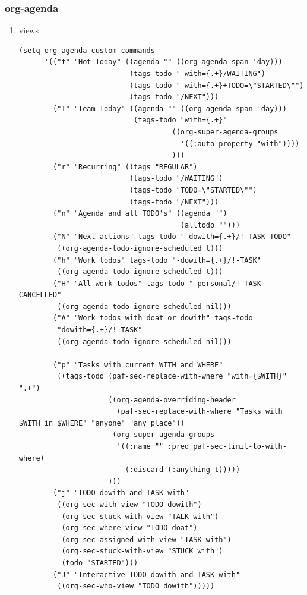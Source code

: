 \documentclass[11pt]{article}
\begin{document}
\subsubsection{org-agenda}
\label{sec:orge0fe785}
\begin{enumerate}
\item views
\label{sec:org885ad2a}
\begin{verbatim}
(setq org-agenda-custom-commands
      '(("t" "Hot Today" ((agenda "" ((org-agenda-span 'day)))
                          (tags-todo "-with={.+}/WAITING")
                          (tags-todo "-with={.+}+TODO=\"STARTED\"")
                          (tags-todo "/NEXT")))
        ("T" "Team Today" ((agenda "" ((org-agenda-span 'day)))
                           (tags-todo "with={.+}"
                                    ((org-super-agenda-groups
                                      '((:auto-property "with"))))
                                    )))
        ("r" "Recurring" ((tags "REGULAR")
                          (tags-todo "/WAITING")
                          (tags-todo "TODO=\"STARTED\"")
                          (tags-todo "/NEXT")))
        ("n" "Agenda and all TODO's" ((agenda "")
                                      (alltodo "")))
        ("N" "Next actions" tags-todo "-dowith={.+}/!-TASK-TODO"
         ((org-agenda-todo-ignore-scheduled t)))
        ("h" "Work todos" tags-todo "-dowith={.+}/!-TASK"
         ((org-agenda-todo-ignore-scheduled t)))
        ("H" "All work todos" tags-todo "-personal/!-TASK-CANCELLED"
         ((org-agenda-todo-ignore-scheduled nil)))
        ("A" "Work todos with doat or dowith" tags-todo
         "dowith={.+}/!-TASK"
         ((org-agenda-todo-ignore-scheduled nil)))

        ("p" "Tasks with current WITH and WHERE"
         ((tags-todo (paf-sec-replace-with-where "with={$WITH}" ".+")
                     ((org-agenda-overriding-header
                       (paf-sec-replace-with-where "Tasks with $WITH in $WHERE" "anyone" "any place"))
                      (org-super-agenda-groups
                       '((:name "" :pred paf-sec-limit-to-with-where)
                         (:discard (:anything t)))))
                     )))
        ("j" "TODO dowith and TASK with"
         ((org-sec-with-view "TODO dowith")
          (org-sec-stuck-with-view "TALK with")
          (org-sec-where-view "TODO doat")
          (org-sec-assigned-with-view "TASK with")
          (org-sec-stuck-with-view "STUCK with")
          (todo "STARTED")))
        ("J" "Interactive TODO dowith and TASK with"
         ((org-sec-who-view "TODO dowith")))))


\end{verbatim}
\end{enumerate}
\end{document}
